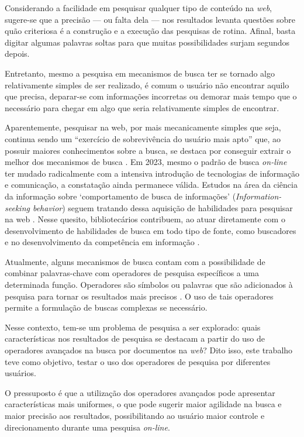 \documentclass[portuguese]{textolivre}
\begin{document}
Considerando a facilidade em pesquisar qualquer tipo de conteúdo na \textit{web}, sugere-se que a precisão — ou falta dela — nos resultados levanta questões sobre quão criteriosa é a construção e a execução das pesquisas de rotina. Afinal, basta digitar algumas palavras soltas para que muitas possibilidades surjam segundos depois.

Entretanto, mesmo a pesquisa em mecanismos de busca ter se tornado algo relativamente simples de ser realizado, é comum o usuário não encontrar aquilo que precisa, deparar-se com informações incorretas ou demorar mais tempo que o necessário para chegar em algo que seria relativamente simples de encontrar.

Aparentemente, pesquisar na web, por mais mecanicamente simples que seja, continua sendo um “exercício de sobrevivência do usuário mais apto” que, ao possuir maiores conhecimentos sobre a busca, se destaca por conseguir extrair o melhor dos mecanismos de busca \cite[p. 1, tradução nossa]{vidmar_darwin_1999}. Em 2023, mesmo o padrão de busca \textit{on-line} ter mudado radicalmente com a intensiva introdução de tecnologias de informação e comunicação, a constatação ainda permanece válida. Estudos na área da ciência da informação sobre ‘comportamento de busca de informações’ (\textit{Information-seeking behavior}) seguem tratando dessa aquisição de habilidades para pesquisar na web \cite{mnguni_web_2022,gonzalez_guitian_comportamiento_2022}. Nesse quesito, bibliotecários contribuem, ao atuar diretamente com o desenvolvimento de habilidades de busca em todo tipo de fonte, como buscadores e no desenvolvimento da competência em informação \cite{lacey_google_2022}.

Atualmente, alguns mecanismos de busca contam com a possibilidade de combinar palavras-chave com operadores de pesquisa específicos a uma determinada função. Operadores são símbolos ou palavras que são adicionados à pesquisa para tornar os resultados mais precisos \cite{google_refinar_2013}. O uso de tais operadores permite a formulação de buscas complexas se necessário.

Nesse contexto, tem-se um problema de pesquisa a ser explorado: quais características nos resultados de pesquisa se destacam a partir do uso de operadores avançados na busca por documentos na \textit{web}? Dito isso, este trabalho teve como objetivo, testar o uso dos operadores de pesquisa por diferentes usuários.

O pressuposto é que a utilização dos operadores avançados pode apresentar características mais uniformes, o que pode sugerir maior agilidade na busca e maior precisão aos resultados, possibilitando ao usuário maior controle e direcionamento durante uma pesquisa \textit{on-line}.
\end{document}
